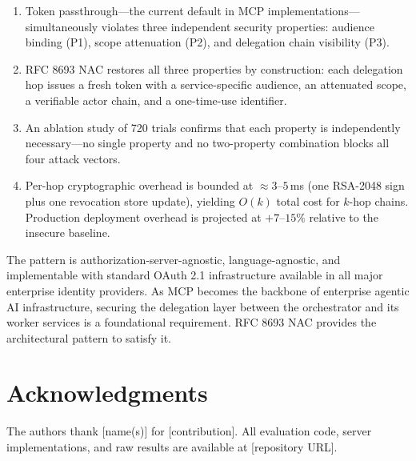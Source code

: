 \documentclass[journal]{IEEEtran}
\begin{document}
\begin{enumerate}
  \item Token passthrough---the current default in MCP implementations---
        simultaneously violates three independent security properties: audience
        binding (P1), scope attenuation (P2), and delegation chain visibility
        (P3).
  \item RFC 8693 NAC restores all three properties by construction: each
        delegation hop issues a fresh token with a service-specific audience,
        an attenuated scope, a verifiable actor chain, and a one-time-use
        identifier.
  \item An ablation study of 720 trials confirms that each property is
        independently necessary---no single property and no two-property
        combination blocks all four attack vectors.
  \item Per-hop cryptographic overhead is bounded at $\approx 3$--$5$\,ms
        (one RSA-2048 sign plus one revocation store update), yielding $O(k)$
        total cost for $k$-hop chains. Production deployment overhead is
        projected at $+7$--$15\%$ relative to the insecure baseline.
\end{enumerate}

The pattern is authorization-server-agnostic, language-agnostic, and
implementable with standard OAuth 2.1 infrastructure available in all major
enterprise identity providers. As MCP becomes the backbone of enterprise agentic
AI infrastructure, securing the delegation layer between the orchestrator and its
worker services is a foundational requirement. RFC 8693 NAC provides the
architectural pattern to satisfy it.

\section*{Acknowledgments}
The authors thank [name(s)] for [contribution]. All evaluation code, server
implementations, and raw results are available at [repository URL].

\balance
\end{document}
